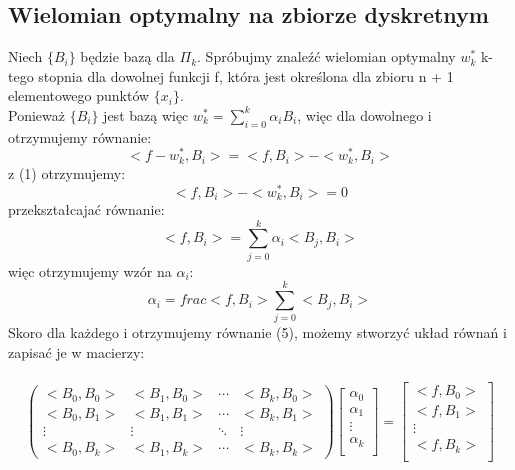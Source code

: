 \documentclass{article}
\begin{document}
\subsection{Wielomian optymalny na zbiorze dyskretnym}
Niech $\{B_{i}\}$ będzie bazą dla $\Pi_{k}$. Spróbujmy znaleźć wielomian optymalny $w_{k}^{*}$ k-tego stopnia dla dowolnej funkcji f, która jest określona dla zbioru n + 1 elementowego punktów $\{ x_{i} \}$.\\
Ponieważ $\{B_{i}\}$ jest bazą więc $w_{k}^{*} = \sum_{i=0}^{k} \alpha_{i}B_{i}$, więc dla dowolnego i otrzymujemy równanie:
\begin{equation}
    < f - w_{k}^{*}, B_{i} > = <f, B_{i}> - <w_{k}^{*}, B_{i} >
\end{equation}
z (1) otrzymujemy:
\begin{equation}
    <f, B_{i}> - <w_{k}^{*}, B_{i} > = 0
\end{equation}
przekształcajać równanie:
\begin{equation}
    <f, B_{i}> = \sum_{j=0}^{k} \alpha_{i} < B_{j},B_{i}>
\end{equation}
więc otrzymujemy wzór na $\alpha_{i}$:
\begin{equation}
    \alpha_{i} = frac{<f, B_{i}>}{\sum_{j=0}^{k} < B_{j},B_{i}>}
\end{equation}
Skoro dla każdego i otrzymujemy równanie (5), możemy stworzyć układ równań i zapisać je w macierzy:\\\\
\begin{equation}
\begin{pmatrix}
  <B_{0},B_{0}> & <B_{1},B_{0}> & \cdots & <B_{k},B_{0}> \\
  <B_{0},B_{1}> & <B_{1},B_{1}> & \cdots & <B_{k},B_{1}> \\
  \vdots  & \vdots  & \ddots & \vdots  \\
  <B_{0},B_{k}> & <B_{1},B_{k}> & \cdots & <B_{k},B_{k}> 
 \end{pmatrix}
\begin{bmatrix}
    \alpha_{0} \\
    \alpha_{1} \\
    \vdots  \\
    \alpha_{k} \\
  \end{bmatrix} 
  =
  \begin{bmatrix}
    <f, B_{0}>  \\
    <f, B_{1}>  \\
    \vdots  \\
    <f, B_{k}>  \\
  \end{bmatrix} 
\end{equation}
\end{document}

